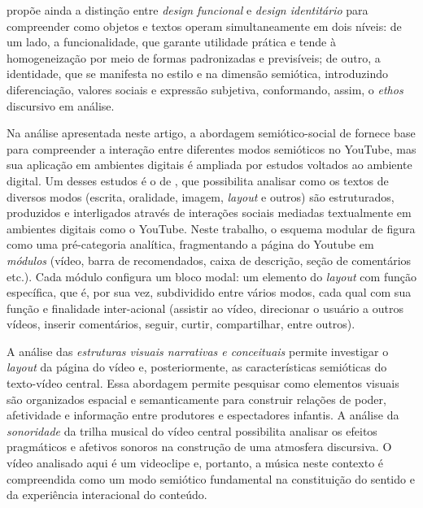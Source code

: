 \documentclass[portuguese]{textolivre}
\begin{document}
\textcite{VanLeeuwen2022MultimodalityIdentity} propõe ainda a distinção entre \textit{design funcional} e \textit{design identitário} para compreender como objetos e textos operam simultaneamente em dois níveis: de um lado, a funcionalidade, que garante utilidade prática e tende à homogeneização por meio de formas padronizadas e previsíveis; de outro, a identidade, que se manifesta no estilo e na dimensão semiótica, introduzindo diferenciação, valores sociais e expressão subjetiva, conformando, assim, o \textit{ethos} discursivo em análise.

Na análise apresentada neste artigo, a abordagem semiótico-social de \textcite{KressVanLeeuwen2020ReadingImages} fornece base para compreender a interação entre diferentes modos semióticos no YouTube, mas sua aplicação em ambientes digitais é ampliada por estudos voltados ao ambiente digital. Um desses estudos é o de \textcite{Benson2016DiscourseYouTube}, que possibilita analisar como os textos de diversos modos (escrita, oralidade, imagem, \textit{layout} e outros) são estruturados, produzidos e interligados através de interações sociais mediadas textualmente em ambientes digitais como o YouTube. Neste trabalho, o esquema modular de \textcite[p. 55]{Benson2016DiscourseYouTube} figura como uma pré-categoria analítica, fragmentando a página do Youtube em \textit{módulos} (vídeo, barra de recomendados, caixa de descrição, seção de comentários etc.). Cada módulo configura um bloco modal: um elemento do \textit{layout} com função específica, que é, por sua vez, subdividido entre vários modos, cada qual com sua função e finalidade inter-acional (assistir ao vídeo, direcionar o usuário a outros vídeos, inserir comentários, seguir, curtir, compartilhar, entre outros).

A análise das \textit{estruturas visuais narrativas e conceituais} \cite{KressVanLeeuwen2020ReadingImages,VieiraResende2016AnaliseDiscursoCritica} permite investigar o \textit{layout} da página do vídeo e, posteriormente, as características semióticas do texto-vídeo central. Essa abordagem permite pesquisar como elementos visuais são organizados espacial e semanticamente para construir relações de poder, afetividade e informação entre produtores e espectadores infantis. A análise da \textit{sonoridade} da trilha musical do vídeo central possibilita analisar os efeitos pragmáticos e afetivos sonoros na construção de uma atmosfera discursiva. O vídeo analisado aqui é um videoclipe e, portanto, a música neste contexto é compreendida como um modo semiótico fundamental na constituição do sentido e da experiência interacional do conteúdo.
\end{document}

